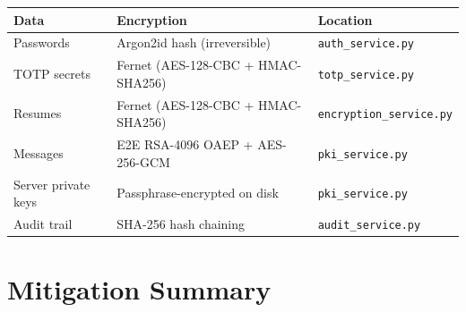 \documentclass[11pt,a4paper]{article}
\begin{document}
\begin{center}
\small
\begin{tabularx}{\textwidth}{lXl}
\toprule
\textbf{Data} & \textbf{Encryption} & \textbf{Location} \\
\midrule
Passwords & Argon2id hash (irreversible) & \texttt{auth\_service.py} \\
TOTP secrets & Fernet (AES-128-CBC + HMAC-SHA256) & \texttt{totp\_service.py} \\
Resumes & Fernet (AES-128-CBC + HMAC-SHA256) & \texttt{encryption\_service.py} \\
Messages & E2E RSA-4096 OAEP + AES-256-GCM & \texttt{pki\_service.py} \\
Server private keys & Passphrase-encrypted on disk & \texttt{pki\_service.py} \\
Audit trail & SHA-256 hash chaining & \texttt{audit\_service.py} \\
\bottomrule
\end{tabularx}
\end{center}

\section{Mitigation Summary}
\end{document}
